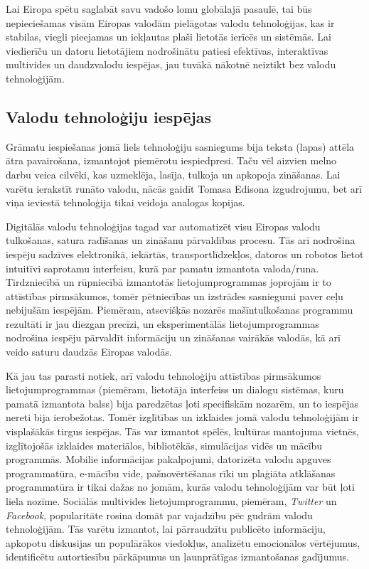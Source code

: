 \begin{multicols}{2}
Lai Eiropa spētu saglabāt savu vadošo lomu globālajā pasaulē, tai būs nepieciešamas visām Eiropas valodām pielāgotas valodu tehnoloģijas, kas ir stabilas, viegli pieejamas un iekļautas plaši lietotās ierīcēs un sistēmās. 
Lai viedierīču un datoru lietotājiem nodrošinātu patiesi efektīvas, interaktīvas multivides un daudzvalodu iespējas, jau tuvākā nākotnē neiztikt bez valodu tehnoloģijām. 
\subsection{Valodu tehnoloģiju iespējas}

Grāmatu iespiešanas jomā liels tehnoloģiju sasniegums bija teksta (lapas) attēla ātra pavairošana, izmantojot piemērotu iespiedpresi. 
Taču vēl aizvien melno darbu veica cilvēki, kas uzmeklēja, lasīja, tulkoja un apkopoja zināšanas. 
Lai varētu ierakstīt runāto valodu, nācās gaidīt Tomasa Edisona izgudrojumu, bet arī viņa ieviestā tehnoloģija tikai veidoja analogas kopijas.

Digitālās valodu tehnoloģijas tagad var automatizēt visu Eiropas valodu tulkošanas, satura radīšanas un zināšanu pārvaldības procesu. 
Tās arī nodrošina iespēju sadzīves elektronikā, iekārtās, transportlīdzekļos, datoros un robotos lietot intuitīvi saprotamu interfeisu, kurā par pamatu izmantota valoda/runa. 
Tirdzniecībā un rūpniecībā izmantotās lietojumprogrammas joprojām ir to attīstības pirmsākumos, tomēr pētniecības un izstrādes sasniegumi paver ceļu nebijušām iespējām. 
Piemēram, atsevišķās nozarēs mašīntulkošanas programmu rezultāti ir jau diezgan precīzi, un eksperimentālās lietojumprogrammas nodrošina iespēju pārvaldīt informāciju un zināšanas vairākās valodās, kā arī veido saturu daudzās Eiropas valodās. 

Kā jau tas parasti notiek, arī valodu tehnoloģiju attīstības pirmsākumos lietojumprogrammas (piemēram, lietotāja interfeiss un dialogu sistēmas, kuru pamatā izmantota balss) bija paredzētas ļoti specifiskām nozarēm, un to iespējas nereti bija ierobežotas. 
Tomēr izglītības un izklaides jomā valodu tehnoloģijām ir visplašākās tirgus iespējas. 
Tās var izmantot spēlēs, kultūras mantojuma vietnēs, izglītojošās izklaides materiālos, bibliotēkās, simulācijas vidēs un mācību programmās. 
Mobilie informācijas pakalpojumi, datorizēta valodu apguves programmatūra, e-mācību vide, pašnovērtēšanas rīki un plaģiāta atklāšanas programmatūra ir tikai dažas no jomām, kurās valodu tehnoloģijām var būt ļoti liela nozīme. 
Sociālās multivides lietojumprogrammu, piemēram, \textit{Twitter} un \textit{Facebook}, popularitāte rosina domāt par vajadzību pēc gudrām valodu tehnoloģijām. 
Tās varētu izmantot, lai pārraudzītu publicēto informāciju, apkopotu diskusijas un populārākos viedokļus, analizētu emocionālos vērtējumus, identificētu autortiesību pārkāpumus un ļaunprātīgas izmantošanas gadījumus.


\end{multicols}
